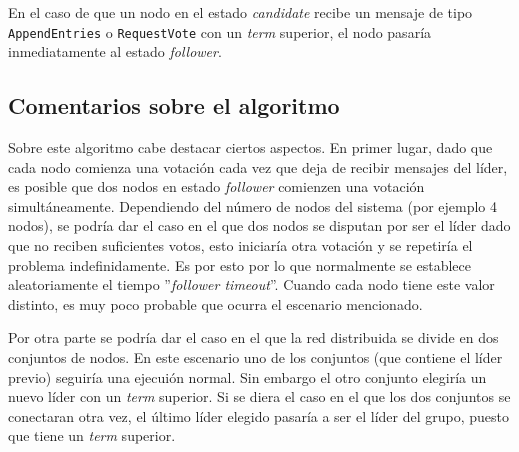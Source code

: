 En el caso de que un nodo en el estado \textit{candidate} recibe un mensaje de tipo \texttt{AppendEntries} o \texttt{RequestVote} con un \textit{term} superior, el nodo pasaría inmediatamente al estado \textit{follower}.

\subsection*{Comentarios sobre el algoritmo}

Sobre este algoritmo cabe destacar ciertos aspectos. En primer lugar, dado que cada nodo comienza una votación cada vez que deja de recibir mensajes del líder, es posible que dos nodos en estado \textit{follower} comienzen una votación simultáneamente. Dependiendo del número de nodos del sistema (por ejemplo 4 nodos), se podría dar el caso en el que dos nodos se disputan por ser el líder dado que no reciben suficientes votos, esto iniciaría otra votación y se repetiría el problema indefinidamente. Es por esto por lo que normalmente se establece aleatoriamente el tiempo ''\textit{follower timeout}''. Cuando cada nodo tiene este valor distinto, es muy poco probable que ocurra el escenario mencionado.

Por otra parte se podría dar el caso en el que la red distribuida se divide en dos conjuntos de nodos. En este escenario uno de los conjuntos (que contiene el líder previo) seguiría una ejecuión normal. Sin embargo el otro conjunto elegiría un nuevo líder con un \textit{term} superior. Si se diera el caso en el que los dos conjuntos se conectaran otra vez, el último líder elegido pasaría a ser el líder del grupo, puesto que tiene un \textit{term} superior.












